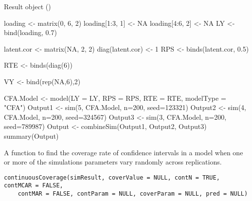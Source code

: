 \documentclass[a4paper]{book}
\begin{document}
%
\begin{SeeAlso}\relax
Result object ()
\end{SeeAlso}
%
\begin{Examples}
\begin{ExampleCode}
loading <- matrix(0, 6, 2)
loading[1:3, 1] <- NA
loading[4:6, 2] <- NA
LY <- bind(loading, 0.7)

latent.cor <- matrix(NA, 2, 2)
diag(latent.cor) <- 1
RPS <- binds(latent.cor, 0.5)

RTE <- binds(diag(6))

VY <- bind(rep(NA,6),2)

CFA.Model <- model(LY = LY, RPS = RPS, RTE = RTE, modelType = "CFA")
Output1 <- sim(5, CFA.Model, n=200, seed=123321)
Output2 <- sim(4, CFA.Model, n=200, seed=324567)
Output3 <- sim(3, CFA.Model, n=200, seed=789987)
Output <- combineSim(Output1, Output2, Output3)
summary(Output)
\end{ExampleCode}
\end{Examples}
%
\begin{Description}\relax
A function to find the coverage rate of confidence intervals in a model when one or more of the simulations parameters vary randomly across replications.
\end{Description}
%
\begin{Usage}
\begin{verbatim}
continuousCoverage(simResult, coverValue = NULL, contN = TRUE, contMCAR = FALSE, 
    contMAR = FALSE, contParam = NULL, coverParam = NULL, pred = NULL)
\end{verbatim}
\end{Usage}
%
\end{document}
